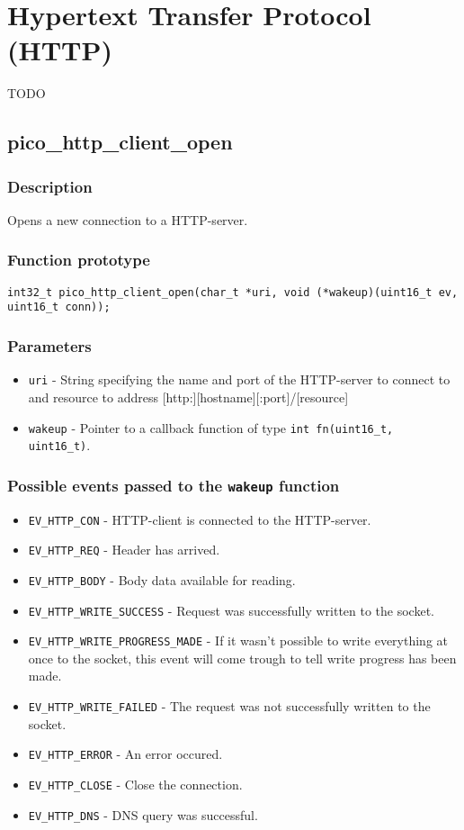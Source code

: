 \section{Hypertext Transfer Protocol (HTTP)}
TODO

\subsection{pico\_http\_client\_open}

\subsubsection*{Description}
Opens a new connection to a HTTP-server.

\subsubsection*{Function prototype}
\texttt{int32\_t pico\_http\_client\_open(char\_t *uri,
                void (*wakeup)(uint16\_t ev, uint16\_t conn));}

\subsubsection*{Parameters}
\begin{itemize}[noitemsep]
\item \texttt{uri} - String specifying the name and port of the HTTP-server to connect to and resource to address [http:][hostname][:port]/[resource]
\item \texttt{wakeup} - Pointer to a callback function of type \texttt{int fn(uint16\_t, uint16\_t)}.
\end{itemize}

\subsubsection*{Possible events passed to the \texttt{wakeup} function}
\begin{itemize}[noitemsep]
\item \texttt{EV\_HTTP\_CON} - HTTP-client is connected to the HTTP-server.
\item \texttt{EV\_HTTP\_REQ} - Header has arrived.
\item \texttt{EV\_HTTP\_BODY} - Body data available for reading.
\item \texttt{EV\_HTTP\_WRITE\_SUCCESS} - Request was successfully written to the socket.
\item \texttt{EV\_HTTP\_WRITE\_PROGRESS\_MADE} - If it wasn't possible to write everything at once to the socket, this event will come trough to tell write progress has been made.
\item \texttt{EV\_HTTP\_WRITE\_FAILED} - The request was not successfully written to the socket.
\item \texttt{EV\_HTTP\_ERROR} - An error occured.
\item \texttt{EV\_HTTP\_CLOSE} - Close the connection.
\item \texttt{EV\_HTTP\_DNS} - DNS query was successful.
\end{itemize}
